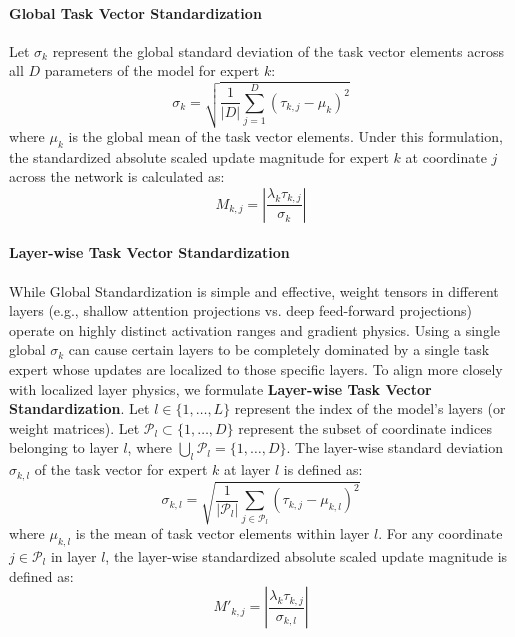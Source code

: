 \paragraph{Global Task Vector Standardization}
Let $\sigma_k$ represent the global standard deviation of the task vector elements across all $D$ parameters of the model for expert $k$:
\begin{equation}
\label{eq:standard_deviation}
\sigma_k = \sqrt{ \frac{1}{|D|} \sum_{j=1}^D (\tau_{k, j} - \mu_k)^2 }
\end{equation}
where $\mu_k$ is the global mean of the task vector elements. Under this formulation, the standardized absolute scaled update magnitude for expert $k$ at coordinate $j$ across the network is calculated as:
\begin{equation}
\label{eq:standardized_magnitude}
M_{k, j} = \left| \frac{\lambda_k \tau_{k, j}}{\sigma_k} \right|
\end{equation}

\paragraph{Layer-wise Task Vector Standardization}
While Global Standardization is simple and effective, weight tensors in different layers (e.g., shallow attention projections vs. deep feed-forward projections) operate on highly distinct activation ranges and gradient physics. Using a single global $\sigma_k$ can cause certain layers to be completely dominated by a single task expert whose updates are localized to those specific layers. To align more closely with localized layer physics, we formulate \textbf{Layer-wise Task Vector Standardization}. Let $l \in \{1, \dots, L\}$ represent the index of the model's layers (or weight matrices). Let $\mathcal{P}_l \subset \{1, \dots, D\}$ represent the subset of coordinate indices belonging to layer $l$, where $\bigcup_l \mathcal{P}_l = \{1, \dots, D\}$. The layer-wise standard deviation $\sigma_{k, l}$ of the task vector for expert $k$ at layer $l$ is defined as:
\begin{equation}
\label{eq:layerwise_standard_deviation}
\sigma_{k, l} = \sqrt{ \frac{1}{|\mathcal{P}_l|} \sum_{j \in \mathcal{P}_l} (\tau_{k, j} - \mu_{k, l})^2 }
\end{equation}
where $\mu_{k, l}$ is the mean of task vector elements within layer $l$. For any coordinate $j \in \mathcal{P}_l$ in layer $l$, the layer-wise standardized absolute scaled update magnitude is defined as:
\begin{equation}
\label{eq:layerwise_standardized_magnitude}
M'_{k, j} = \left| \frac{\lambda_k \tau_{k, j}}{\sigma_{k, l}} \right|
\end{equation}


